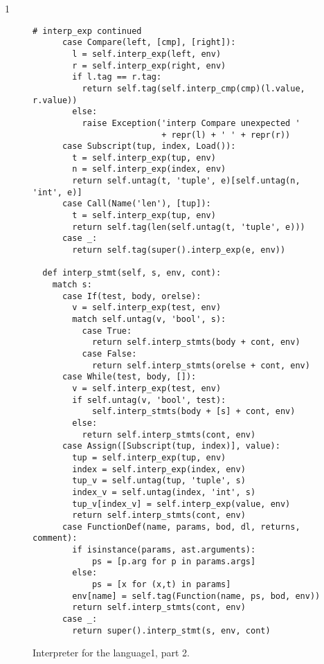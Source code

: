 \documentclass[7x10]{TimesAPriori_MIT}%
\def\pythonEd{1}
\def\edition{1}
\newcommand{\pythonColor}[0]{}
\newcommand{\python}[1]{{\if\edition\pythonEd\pythonColor #1\fi}}
\numberwithin{theorem}{chapter}
\numberwithin{definition}{chapter}
\numberwithin{equation}{chapter}
\begin{document}
{\if\edition\pythonEd\pythonColor
  \begin{figure}[tbp]
\begin{tcolorbox}[colback=white]    
\begin{lstlisting}[basicstyle=\ttfamily\footnotesize]
  # interp_exp continued    
      case Compare(left, [cmp], [right]):
        l = self.interp_exp(left, env)
        r = self.interp_exp(right, env)
        if l.tag == r.tag:
          return self.tag(self.interp_cmp(cmp)(l.value, r.value))
        else:
          raise Exception('interp Compare unexpected '
                          + repr(l) + ' ' + repr(r))
      case Subscript(tup, index, Load()):
        t = self.interp_exp(tup, env)
        n = self.interp_exp(index, env)
        return self.untag(t, 'tuple', e)[self.untag(n, 'int', e)]
      case Call(Name('len'), [tup]):
        t = self.interp_exp(tup, env)
        return self.tag(len(self.untag(t, 'tuple', e)))
      case _:
        return self.tag(super().interp_exp(e, env))

  def interp_stmt(self, s, env, cont):
    match s:
      case If(test, body, orelse):
        v = self.interp_exp(test, env)
        match self.untag(v, 'bool', s):
          case True:
            return self.interp_stmts(body + cont, env)
          case False:
            return self.interp_stmts(orelse + cont, env)
      case While(test, body, []):
        v = self.interp_exp(test, env)
        if self.untag(v, 'bool', test):
            self.interp_stmts(body + [s] + cont, env)
        else:
          return self.interp_stmts(cont, env)
      case Assign([Subscript(tup, index)], value):
        tup = self.interp_exp(tup, env)
        index = self.interp_exp(index, env)
        tup_v = self.untag(tup, 'tuple', s)
        index_v = self.untag(index, 'int', s)
        tup_v[index_v] = self.interp_exp(value, env)
        return self.interp_stmts(cont, env)
      case FunctionDef(name, params, bod, dl, returns, comment):
        if isinstance(params, ast.arguments):
            ps = [p.arg for p in params.args]
        else:
            ps = [x for (x,t) in params]
        env[name] = self.tag(Function(name, ps, bod, env))
        return self.interp_stmts(cont, env)
      case _:
        return super().interp_stmt(s, env, cont)
\end{lstlisting}
\end{tcolorbox}

\caption{Interpreter for the \LangDyn{} language\python{, part 2}.}
\label{fig:interp-Ldyn-2}
\end{figure}
\fi}
\end{document}
